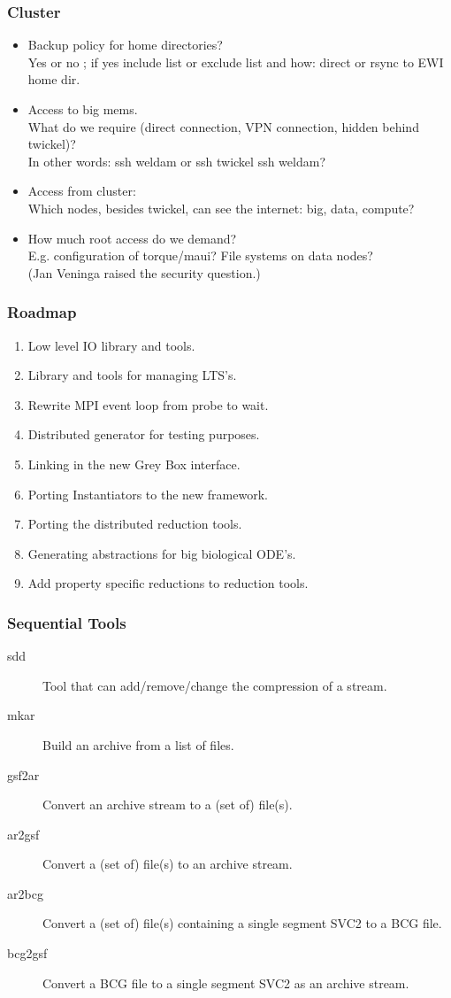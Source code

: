 \documentclass{beamer}
\begin{document}
\begin{frame}
\frametitle{Cluster}
\begin{itemize}
\item Backup policy for home directories?
\\
Yes or no ; if yes include list or exclude list  and how: direct or rsync to EWI home dir.
\item Access to big mems.
\\
What do we require (direct connection, VPN connection, hidden behind twickel)?
\\
In other words: ssh weldam or ssh twickel ssh weldam?
\item Access from cluster:
\\
Which nodes, besides twickel, can see the internet: big, data, compute?
\item How much root access do we demand?
\\
E.g. configuration of torque/maui? File systems on data nodes?
\\
(Jan Veninga raised the security question.)
\end{itemize}
\end{frame}

\begin{frame}
\frametitle{Roadmap}
\begin{enumerate}
\item Low level IO library and tools.
\item Library and tools for managing LTS's.
\item Rewrite MPI event loop from probe to wait.
\item Distributed generator for testing purposes.
\item Linking in the new Grey Box interface.
\item Porting Instantiators to the new framework.
\item Porting the distributed reduction tools.
\item Generating abstractions for big biological ODE's.
\item Add property specific reductions to reduction tools.
\end{enumerate}
\end{frame}

\begin{frame}
\frametitle{Sequential Tools}
\begin{description}
\item[sdd] Tool that can add/remove/change the compression of a stream.
\item[mkar] Build an archive from a list of files.
\item[gsf2ar] Convert an archive stream to a (set of) file(s).
\item[ar2gsf] Convert a (set of) file(s) to an archive stream.
\item[ar2bcg] Convert a (set of) file(s) containing a single segment SVC2 to a BCG file.
\item[bcg2gsf] Convert a BCG file to a single segment SVC2 as an archive stream.
\end{description}
\end{frame}
\end{document}
